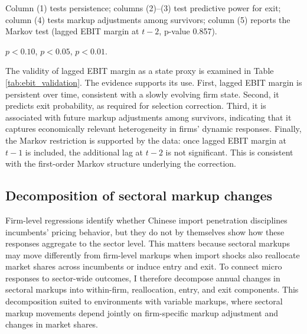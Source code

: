 \documentclass[12pt]{article}
\begin{document}
\begin{table}[!htb]
\begin{threeparttable}
\begin{tablenotes}[flushleft]
    \item Column (1) tests persistence; columns (2)--(3) test predictive power for exit; column (4) tests markup adjustments among survivors; column (5) reports the Markov test (lagged EBIT margin at $t-2$, p-value 0.857).
    \item \sym{*} \(p<0.10\), \sym{**} \(p<0.05\), \sym{***} \(p<0.01\).
    \end{tablenotes}
    \end{threeparttable}
    \renewcommand{\arraystretch}{1}
\end{table}

The validity of lagged EBIT margin as a state proxy is examined in Table \ref{tab:ebit_validation}. The evidence supports its use. First, lagged EBIT margin is persistent over time, consistent with a slowly evolving firm state. Second, it predicts exit probability, as required for selection correction. Third, it is associated with future markup adjustments among survivors, indicating that it captures economically relevant heterogeneity in firms' dynamic responses. Finally, the Markov restriction is supported by the data: once lagged EBIT margin at $t-1$ is included, the additional lag at $t-2$ is not significant. This is consistent with the first-order Markov structure underlying the correction. 

\subsection{Decomposition of sectoral markup changes}

Firm-level regressions identify whether Chinese import penetration disciplines incumbents' pricing behavior, but they do not by themselves show how these responses aggregate to the sector level. This matters because sectoral markups may move differently from firm-level markups when import shocks also reallocate market shares across incumbents or induce entry and exit. To connect micro responses to sector-wide outcomes, I therefore decompose annual changes in sectoral markups into within-firm, reallocation, entry, and exit components. This decomposition suited to environments with variable markups, where sectoral markup movements depend jointly on firm-specific markup adjustment and changes in market shares. 
\end{document}
